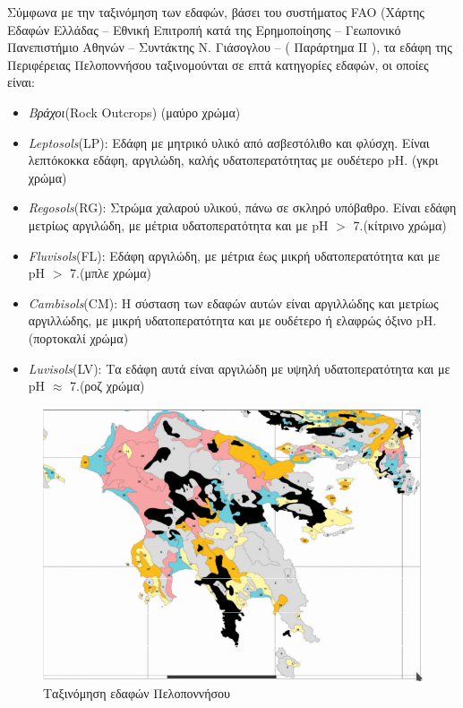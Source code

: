 \documentclass[12pt]{article}
\begin{document}
	Σύμφωνα με την ταξινόμηση των εδαφών, βάσει του συστήματος FAO (Χάρτης Εδαφών Ελλάδας – Εθνική Επιτροπή κατά της Ερημοποίησης – Γεωπονικό Πανεπιστήμιο Αθηνών – Συντάκτης Ν. Γιάσογλου – ( Παράρτημα IΙ ), τα εδάφη της Περιφέρειας Πελοποννήσου ταξινομούνται σε επτά κατηγορίες εδαφών, οι οποίες είναι:

	\begin{itemize}
		\item \emph{Βράχοι}(Rock Outcrops) (μαύρο χρώμα)
		\item \emph{Leptosols}(LP): Εδάφη με μητρικό υλικό από ασβεστόλιθο και φλύσχη. Είναι λεπτόκοκκα εδάφη, αργιλώδη, καλής υδατοπερατότητας με ουδέτερο pH. (γκρι χρώμα)
		\item \emph{Regosols}(RG): Στρώμα χαλαρού υλικού, πάνω σε σκληρό υπόβαθρο. Είναι εδάφη μετρίως αργιλώδη, με μέτρια υδατοπερατότητα και με pH $>$ 7.(κίτρινο χρώμα)
		\item \emph{Fluvisols}(FL): Εδάφη αργιλώδη, με μέτρια έως μικρή υδατοπερατότητα και με pH $>$ 7.(μπλε χρώμα)
		\item \emph{Cambisols}(CM): Η σύσταση των εδαφών αυτών είναι αργιλλώδης και μετρίως αργιλλώδης, με μικρή υδατοπερατότητα και με ουδέτερο ή ελαφρώς όξινο pH. (πορτοκαλί χρώμα)
		\item \emph{Luvisols}(LV): Τα εδάφη αυτά είναι αργιλώδη με υψηλή υδατοπερατότητα και με pH $\approx$ 7.(ροζ χρώμα)
	\end{itemize}

	\begin{figure} [H]
		\begin{center}
			\includegraphics [scale = 0.70] {edafi.png}
			\caption{Ταξινόμηση εδαφών Πελοποννήσου}
			\label{edafi}
		\end{center}
	\end{figure}
	
\end{document}
